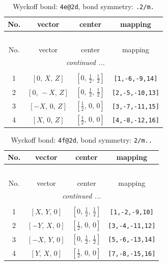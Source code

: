 \documentclass[fleqn,8pt]{jsarticle}
\begin{document}
\renewcommand{\arraystretch}{1.2}
\begin{longtable}{cccc}
\caption{Wyckoff bond: {\tt 4e@2d}, bond symmetry: {\tt .2/m.}}
 \\
 \hline \hline
No. & vector & center & mapping \\ \hline \endfirsthead

\multicolumn{3}{l}{\tablename\ \thetable{}} \\
 \hline \hline
No. & vector & center & mapping \\ \hline \endhead

 \hline \hline
\multicolumn{3}{r}{\footnotesize\it continued ...} \\ \endfoot

 \hline \hline
\multicolumn{3}{r}{} \\ \endlastfoot

1 & $\left[ 0,\, X,\, Z \right]$ & $\left[ 0,\, \frac{1}{2},\, \frac{1}{2} \right]$ & {\tt [1,-6,-9,14]} \\ \hline
2 & $\left[ 0,\, - X,\, Z \right]$ & $\left[ 0,\, \frac{1}{2},\, \frac{1}{2} \right]$ & {\tt [2,-5,-10,13]} \\ \hline
3 & $\left[ - X,\, 0,\, Z \right]$ & $\left[ \frac{1}{2},\, 0,\, 0 \right]$ & {\tt [3,-7,-11,15]} \\ \hline
4 & $\left[ X,\, 0,\, Z \right]$ & $\left[ \frac{1}{2},\, 0,\, 0 \right]$ & {\tt [4,-8,-12,16]} \\
\end{longtable}
\renewcommand{\arraystretch}{1.2}
\begin{longtable}{cccc}
\caption{Wyckoff bond: {\tt 4f@2d}, bond symmetry: {\tt 2/m..}}
 \\
 \hline \hline
No. & vector & center & mapping \\ \hline \endfirsthead

\multicolumn{3}{l}{\tablename\ \thetable{}} \\
 \hline \hline
No. & vector & center & mapping \\ \hline \endhead

 \hline \hline
\multicolumn{3}{r}{\footnotesize\it continued ...} \\ \endfoot

 \hline \hline
\multicolumn{3}{r}{} \\ \endlastfoot

1 & $\left[ X,\, Y,\, 0 \right]$ & $\left[ 0,\, \frac{1}{2},\, \frac{1}{2} \right]$ & {\tt [1,-2,-9,10]} \\ \hline
2 & $\left[ - Y,\, X,\, 0 \right]$ & $\left[ \frac{1}{2},\, 0,\, 0 \right]$ & {\tt [3,-4,-11,12]} \\ \hline
3 & $\left[ - X,\, Y,\, 0 \right]$ & $\left[ 0,\, \frac{1}{2},\, \frac{1}{2} \right]$ & {\tt [5,-6,-13,14]} \\ \hline
4 & $\left[ Y,\, X,\, 0 \right]$ & $\left[ \frac{1}{2},\, 0,\, 0 \right]$ & {\tt [7,-8,-15,16]} \\
\end{longtable}
\end{document}
